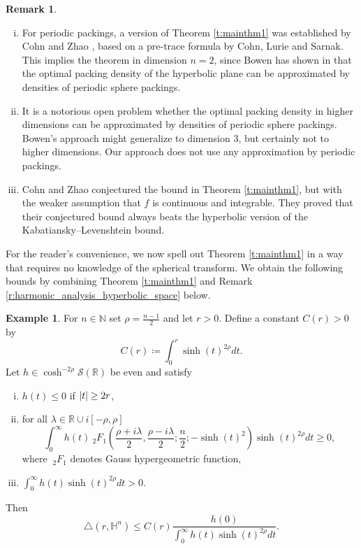 \documentclass[12pt,reqno,a4paper]{amsart}
\theoremstyle{theorem}
\theoremstyle{definition}
\newtheorem{example}[theorem]{Example}
\newtheorem{remark}[theorem]{Remark}
\numberwithin{theorem}{section}
\numberwithin{equation}{section}
\newcommand{\R}{\mathbb{R}}
\newcommand{\N}{\mathbb{N}}
\DeclarePairedDelimiter{\abs}{\lvert}{\rvert}
\begin{document}
\begin{remark}
	\begin{enumerate}[(i)]
		\item For periodic packings, a version of Theorem \ref{t:mainthm1} was established by Cohn and Zhao \cite{CohnZhao}, based on a pre-trace formula by Cohn, Lurie and Sarnak. This implies the theorem in dimension $n=2$, since Bowen has shown in \cite{BowenPeriodicityDim2} that the optimal packing density of the hyperbolic plane can be approximated by densities of periodic sphere packings.
		\item It is a notorious open problem whether the optimal packing density in higher dimensions can be approximated by densities of periodic sphere packings. Bowen's approach might generalize to dimension $3$, but certainly not to higher dimensions. Our approach does not use any approximation by periodic packings.
		\item Cohn and Zhao conjectured the bound in Theorem \ref{t:mainthm1}, but with the weaker assumption that $f$ is continuous and integrable. They proved that their conjectured bound always beats the hyperbolic version  of the Kabatiansky--Levenshtein bound.
	\end{enumerate}
\end{remark}
For the reader's convenience, we now spell out Theorem \ref{t:mainthm1} in a way that requires no knowledge of the spherical transform.
We obtain the following bounds by combining Theorem \ref{t:mainthm1} and Remark \ref{r:harmonic_analysis_hyperbolic_space} below.
\begin{example}\label{e:hyperbolic_bounds}
	For $n\in \N$ set $\rho=\frac{n-1}{2}$ and let $r>0$. Define a constant $C(r)>0$ by 
	\[C(r)\coloneqq \int_0^r\sinh(t)^{2\rho}dt.\]
	Let $h\in \cosh^{-2\rho}\mathscr{S}(\R)$ be even and satisfy
	\begin{enumerate}[(i)]
		\item $h(t)\leq 0$ if $\abs{t}\geq 2r$,
		\item for all $\lambda\in \R\cup i[-\rho,\rho]$ \[\int_0^\infty h(t)~_2F_1\left(\frac{\rho+i\lambda}{2},\frac{\rho-i\lambda}{2};\frac{n}{2};-\sinh(t)^2\right)\sinh(t)^{2\rho}dt \geq 0,\]
		where $~_2F_1$ denotes Gauss hypergeometric function,
		\item $\int_0^\infty h(t)\sinh(t)^{2\rho}dt >0$.
	\end{enumerate} 
	Then
	\[\triangle(r,\mathbb{H}^n)\leq C(r)\frac{h(0)}{\int_0^\infty h(t)\sinh(t)^{2\rho}dt}.\] 
\end{example}
\end{document}
